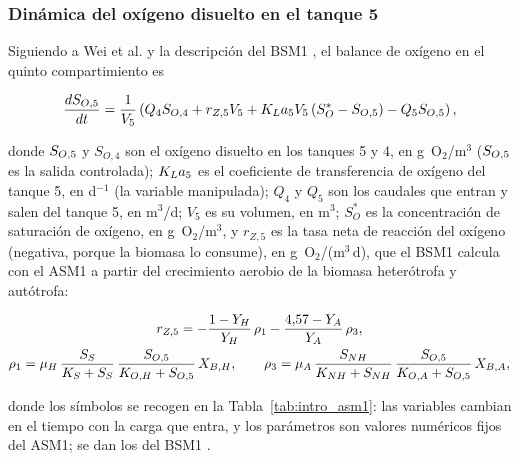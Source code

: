 \subsubsection*{Dinámica del oxígeno disuelto en el tanque 5}

Siguiendo a Wei et al. \cite{wei2020disturbance} y la descripción del BSM1
\cite{alex2008bsm1}, el balance de oxígeno en el quinto compartimiento es

\begin{equation}
    \frac{dS_{O,5}}{dt} = \frac{1}{V_{5}}
    \left( Q_{4}S_{O,4} + r_{Z,5}V_5 + K_{L}a_{5} V_{5}\,(S_{O}^{*} - S_{O,5})
    - Q_{5}S_{O,5} \right),
    \label{eq:intro_do}
\end{equation}

donde $S_{O,5}$ y $S_{O,4}$ son el oxígeno disuelto en los tanques 5 y 4, en g~O$_2$/m$^3$ ($S_{O,5}$ es la
salida controlada); $K_{L}a_{5}$ es el coeficiente de transferencia de oxígeno del tanque 5, en d$^{-1}$
(la variable manipulada); $Q_4$ y $Q_5$ son los caudales que entran y salen del tanque 5, en
m$^3$/d; $V_5$ es su volumen, en m$^3$; $S_O^{*}$ es la concentración de saturación de oxígeno, en
g~O$_2$/m$^3$, y $r_{Z,5}$ es la tasa neta de reacción del oxígeno (negativa, porque la biomasa lo
consume), en g~O$_2$/(m$^3$\,d), que el BSM1 calcula con el ASM1 \cite{henze1987asm1} a partir del
crecimiento aerobio de la biomasa heterótrofa y autótrofa:

\begin{equation}
  \begin{gathered}
    r_{Z,5} = -\frac{1 - Y_H}{Y_H}\,\rho_1 - \frac{4{,}57 - Y_A}{Y_A}\,\rho_3 ,\\
    \rho_1 = \mu_H\,\frac{S_S}{K_S + S_S}\,\frac{S_{O,5}}{K_{O,H} + S_{O,5}}\,X_{B,H},
    \qquad
    \rho_3 = \mu_A\,\frac{S_{NH}}{K_{NH} + S_{NH}}\,\frac{S_{O,5}}{K_{O,A} + S_{O,5}}\,X_{B,A},
  \end{gathered}
  \label{eq:intro_rz}
\end{equation}

donde los símbolos se recogen en la Tabla~\ref{tab:intro_asm1}: las variables cambian en el tiempo con
la carga que entra, y los parámetros son valores numéricos fijos del ASM1; se dan los del BSM1
\cite{alex2008bsm1}.

